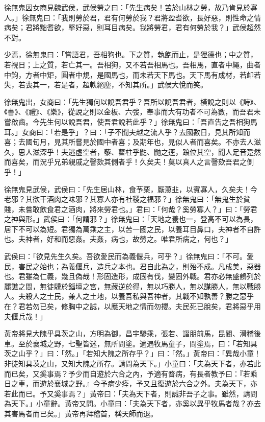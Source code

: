 
\begin{pinyinscope}
徐無鬼因女商見魏武侯，武侯勞之曰：「先生病矣！苦於山林之勞，故乃肯見於寡人。」徐無鬼曰：「我則勞於君，君有何勞於我？君將盈耆欲，長好惡，則性命之情病矣；君將黜耆欲，掔好惡，則耳目病矣。我將勞君，君有何勞於我？」武侯超然不對。

少焉，徐無鬼曰：「嘗語君，吾相狗也。下之質，執飽而止，是狸德也；中之質，若視日；上之質，若亡其一。吾相狗，又不若吾相馬也。吾相馬，直者中繩，曲者中鉤，方者中矩，圓者中規，是國馬也，而未若天下馬也。天下馬有成材，若卹若失，若喪其一，若是者，超軼絕塵，不知其所。」武侯大悅而笑。

徐無鬼出，女商曰：「先生獨何以說吾君乎？吾所以說吾君者，橫說之則以《詩》、《書》、《禮》、《樂》，從說之則以金板、六弢，奉事而大有功者不可為數，而吾君未嘗啟齒。今先生何以說吾君，使吾君說若此乎？」徐無鬼曰：「吾直告之吾相狗馬耳。」女商曰：「若是乎」？曰：「子不聞夫越之流人乎？去國數日，見其所知而喜；去國旬月，見其所嘗見於國中者喜；及期年也，見似人者而喜矣。不亦去人滋久，思人滋深乎！夫逃虛空者，藜、藋柱乎鼪、鼬之逕，踉位其空，聞人足音跫然而喜矣，而況乎兄弟親戚之謦欬其側者乎！久矣夫！莫以真人之言謦欬吾君之側乎！」

徐無鬼見武侯，武侯曰：「先生居山林，食芧栗，厭蔥韭，以賓寡人，久矣夫！今老邪？其欲干酒肉之味邪？其寡人亦有社稷之福邪？」徐無鬼曰：「無鬼生於貧賤，未嘗敢飲食君之酒肉，將來勞君也。」君曰：「何哉？奚勞寡人？」曰：「勞君之神與形。」武侯曰：「何謂邪？」徐無鬼曰：「天地之養也一，登高不可以為長，居下不可以為短。君獨為萬乘之主，以苦一國之民，以養耳目鼻口，夫神者不自許也。夫神者，好和而惡姦。夫姦，病也，故勞之。唯君所病之，何也？」

武侯曰：「欲見先生久矣。吾欲愛民而為義偃兵，可乎？」徐無鬼曰：「不可。愛民，害民之始也；為義偃兵，造兵之本也。君自此為之，則殆不成。凡成美，惡器也。君雖為仁義，幾且偽哉！形固造形，成固有伐，變固外戰。君亦必無盛鶴列於麗譙之間，無徒驥於錙壇之宮，無藏逆於得，無以巧勝人，無以謀勝人，無以戰勝人。夫殺人之士民，兼人之土地，以養吾私與吾神者，其戰不知孰善？勝之惡乎在？君若勿已矣，修胸中之誠，以應天地之情而勿攖。夫民死已脫矣，君將惡乎用夫偃兵哉！」

黃帝將見大隗乎具茨之山，方明為御，昌宇驂乘，張若、謵朋前馬，昆閽、滑稽後車。至於襄城之野，七聖皆迷，無所問塗。適遇牧馬童子，問塗焉，曰：「若知具茨之山乎？」曰：「然。」「若知大隗之所存乎？」曰：「然。」黃帝曰：「異哉小童！非徒知具茨之山，又知大隗之所存。請問為天下。」小童曰：「夫為天下者，亦若此而已矣，又奚事焉？予少而自遊於六合之內，予適有瞀病，有長者教予曰：『若乘日之車，而遊於襄城之野。』今予病少痊，予又且復遊於六合之外。夫為天下，亦若此而已。予又奚事焉？」黃帝曰：「夫為天下者，則誠非吾子之事。雖然，請問為天下。」小童辭。黃帝又問。小童曰：「夫為天下者，亦奚以異乎牧馬者哉？亦去其害馬者而已矣。」黃帝再拜稽首，稱天師而退。


\end{pinyinscope}

